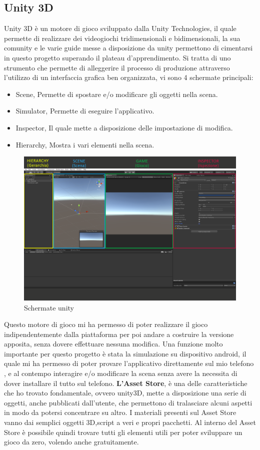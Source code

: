 \documentclass[
a4paper,
cleardoublepage=empty,
headings=twolinechapter,
numbers=autoenddot,
]{scrbook}
\begin{document}
    \subsection{Unity 3D}\label{unity3D}
    Unity 3D è un motore di gioco sviluppato dalla Unity
    Technologies, il quale permette di realizzare dei videogiochi tridimensionali e bidimensionali, la sua comunity e le varie guide messe a disposizione da unity permettono di cimentarsi in questo progetto superando il plateau d'apprendimento.
    Si tratta di uno strumento che permette di alleggerire il processo di produzione attraverso l'utilizzo di un interfaccia grafica ben organizzata, vi sono 4 schermate principali:
    \begin{itemize}
    	\item Scene, Permette di spostare e/o modificare gli oggetti nella scena.
    	\item Simulator, Permette di eseguire l'applicativo.
    	\item Inspector, Il quale mette a disposizione delle impostazione di modifica.
    	\item Hierarchy, Mostra i vari elementi nella scena.
    \end{itemize}
    \begin{figure}[H]
    	\centering
    	\includegraphics[width=0.8\linewidth]{image/unity}
    	\caption{Schermate unity}
    	\label{fig:unity}
    \end{figure}
    Questo motore di gioco mi ha permesso  di poter realizzare il gioco indipendentemente dalla piattaforma per poi andare a costruire la versione apposita, senza dovere effettuare nessuna modifica.
    Una funzione molto importante per questo progetto è stata la simulazione su dispositivo android, il quale mi ha permesso di poter provare l'applicativo direttamente sul mio telefono , e al contempo interagire e/o modificare la scena senza avere la necessita di dover installare il tutto sul telefono.
    \textbf{L'Asset Store}, è una delle caratteristiche che ho trovato fondamentale, ovvero unity3D, mette a disposizione una serie di oggetti, anche pubblicati dall'utente, che permettono di tralasciare alcuni aspetti in modo da potersi concentrare su altro.
    I materiali presenti sul Asset Store vanno dai semplici oggetti 3D,script a veri e propri pacchetti.
    Al interno del Asset Store è possibile quindi trovare tutti gli elementi utili per poter sviluppare un gioco da zero, volendo anche gratuitamente.
\end{document}
